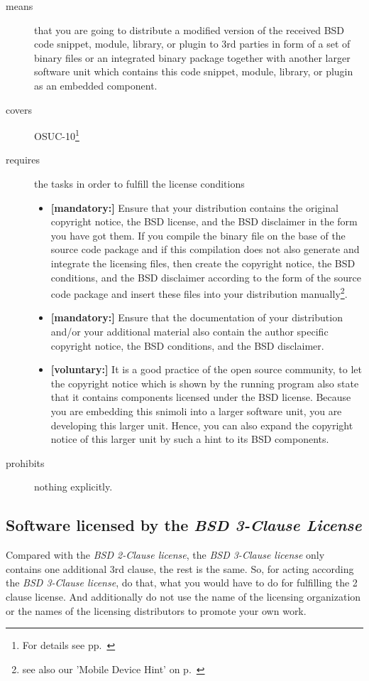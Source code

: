 \begin{description}
\item[means] that you are going to distribute a modified version of the received
BSD code snippet, module, library, or plugin to 3rd parties in form of a set of
binary files or an integrated binary package together with another larger
software unit which contains this code snippet, module, library, or plugin as
an embedded component.
\item[covers] OSUC-10\footnote{For details see pp.\ \pageref{OSUC-10-DEF}}
\item[requires] the tasks in order to fulfill the license conditions
\begin{itemize}
  \item  \textbf{[mandatory:]} Ensure that your distribution contains the
  original copyright notice, the BSD license, and the BSD disclaimer in the form
  you have got them. If you compile the binary file on the base of the source
  code package and if this compilation does not also generate and integrate the
  licensing files, then create the copyright notice, the BSD conditions, and the
  BSD disclaimer according to the form of the source code package and insert
  these files into your distribution manually\footnote{see also our 'Mobile
  Device Hint' on p.\ \pageref{MobileDeviceHint}}.
  \item  \textbf{[mandatory:]} Ensure that the documentation of your
  distribution and/or your additional material also contain the author specific
  copyright notice, the BSD conditions, and the BSD disclaimer.
 \item \textbf{[voluntary:]} It is a good practice of the open source
  community, to let the copyright notice which is shown by the running program
  also state that it contains components licensed under the BSD license. Because
  you are embedding this snimoli into a larger software unit, you are
  developing this larger unit. Hence, you can also expand the copyright notice
  of this larger unit by such a hint to its BSD components.
\end{itemize}
\item[prohibits] nothing explicitly.
\end{description}

\subsection{Software licensed by the \emph{BSD 3-Clause License}}

Compared with the \textit{BSD 2-Clause license}, the \textit{BSD 3-Clause
license} only contains one additional 3rd clause, the rest is the same. So, for
acting according the \textit{BSD 3-Clause license}, do that, what you would have
to do for fulfilling the 2 clause license. And additionally do not use the name
of the licensing organization or the names of the licensing distributors to promote
your own work.

